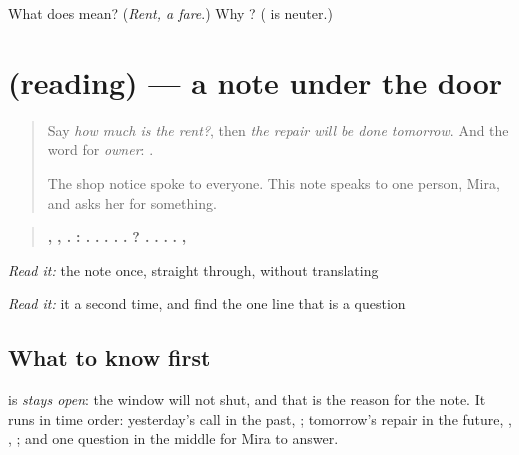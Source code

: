 \begin{tcolorbox}[breakable,colback=teal!4,colframe=teal!35!black,title={Before you move on}]
What does \textbf{} mean? (\emph{Rent, a fare}.) Why \textbf{}? (\textbf{} is neuter.)
\end{tcolorbox}
\section[(reading)]{(reading) — a note under the door}

\label{lesson:GU-C152-malik-chiththi}



\begin{quote}
Say \emph{how much is the rent?}, then \emph{the repair will be done tomorrow}. And the word for \emph{owner}: \textbf{}.

The shop notice spoke to everyone. This note speaks to one person, Mira, and asks her for something.
\end{quote}

\begin{tcolorbox}[breakable,skin=enhanced,colback=orange!6,colframe=orange!45!black,boxrule=0.5pt,arc=1mm,left=6pt,right=6pt,top=4pt,bottom=4pt,fonttitle=\bfseries,title={Read this}]
\begin{quote}
\textbf{}
\end{quote}

\begin{quote}
\textbf{  ,} \textbf{  , .} \textbf{   :     .} \textbf{   .} \textbf{  .     .} \textbf{  .} \textbf{   ?   .} \textbf{    .} \textbf{   .} \textbf{  .} \textbf{, }
\end{quote}

\emph{Read it:} the note once, straight through, without translating

\emph{Read it:} it a second time, and find the one line that is a question
\end{tcolorbox}

\subsection*{What to know first}
\textbf{  } is \emph{stays open}: the window will not shut, and that is the reason for the note. It runs in time order: yesterday's call in the past, \textbf{ }; tomorrow's repair in the future, \textbf{}, \textbf{}, \textbf{}; and one question in the middle for Mira to answer.

